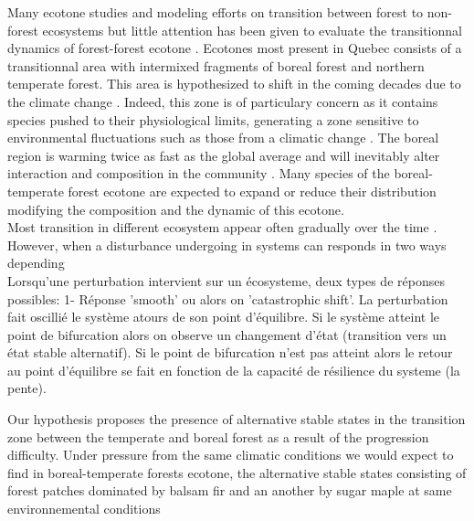 


Many ecotone studies and modeling efforts on transition between forest to non-forest ecosystems \cite{Scheffer2012,Scheffer2001,Hirota2011} but little attention has been given to evaluate the transitionnal dynamics of forest-forest ecotone \cite{Goldblum2010,Graignic2013}. Ecotones most present in Quebec consists of a transitionnal area with intermixed fragments of boreal forest and northern temperate forest\cite{Goldblum2010}. This area is hypothesized to shift in the coming decades due to the climate change \cite{Scheffer2012}. Indeed, this zone is of particulary concern as it contains species pushed to their physiological limits, generating a zone sensitive to environmental fluctuations such as those from a climatic change \cite{Messaoud2007,Goldblum2010}. The boreal region is warming twice as fast as the global average and will inevitably alter interaction and composition in the community \cite{Scheffer2012,Hughes2000}. Many species of the boreal-temperate forest ecotone are expected to expand or reduce their distribution \cite{Graignic2013,Goldblum2005,Hughes2000} modifying the composition and the dynamic of this ecotone.\\


Most transition in different ecosystem appear often gradually over the time \cite{Scheffer2001,scheffer2009critical}. However, when a disturbance undergoing in systems can responds in two ways depending   \\

 Lorsqu'une perturbation intervient sur un écosysteme, deux types de réponses possibles: 1- Réponse 'smooth' ou alors on 'catastrophic shift'. La perturbation fait oscillié le système atours de son point d'équilibre. Si le système atteint le point de bifurcation alors on observe un changement d'état (transition vers un état stable alternatif). Si le point de bifurcation n'est pas atteint alors le retour au point d'équilibre se fait en fonction de la capacité de résilience du systeme (la pente).  

Our hypothesis proposes the presence of alternative stable states in the transition zone between the temperate and boreal forest as a result of the progression difficulty. Under pressure from the same climatic conditions we would expect to find in boreal-temperate forests ecotone, the alternative stable states consisting of forest patches dominated by balsam fir and an another by sugar maple at same environnemental conditions\\ 

